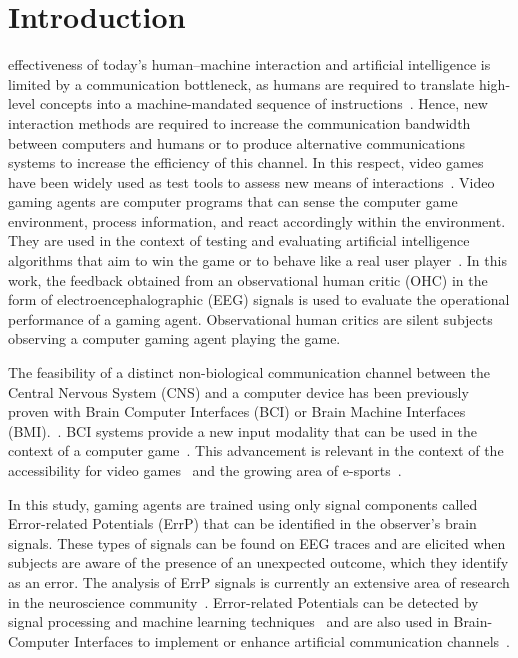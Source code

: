 \documentclass[journal]{IEEEtran}
\begin{document}
\section{Introduction}



 effectiveness of today's human–machine interaction and artificial intelligence is limited by a communication bottleneck, as humans are required to translate high-level concepts into a machine-mandated sequence of instructions~\cite{Xu2020,CURSOR-CONTROL-PAPER}.   Hence, new interaction methods are required to increase the communication bandwidth between computers and humans or to produce alternative communications systems to increase the efficiency of this channel.  In this respect, video games have been widely used as test tools to assess new means of interactions~\cite{Carter2014,Barr2007}. Video gaming agents are computer programs that can sense the computer game environment, process information, and react accordingly within the environment.  They are used in the context of testing and evaluating artificial intelligence algorithms that aim to win the game or to behave like a real user player~\cite{Zhao2020}.
In this work, the feedback obtained from an observational human critic (OHC) in the form of electroencephalographic (EEG) signals is used to evaluate the operational performance of a gaming agent.  Observational human critics are silent subjects observing a computer gaming agent playing the game.

The feasibility of a distinct non-biological communication channel between the Central Nervous System (CNS) and a computer device has been previously proven with Brain Computer Interfaces (BCI) or Brain Machine Interfaces (BMI).~\cite{Vasiljevic2020}.  BCI systems provide a new input modality that can be used in the context of a computer game~\cite{Scherer2012,Nijholt2007}. This advancement is relevant in the context of the accessibility for video games~\cite{Aguado-Delgado2020} and the growing area of e-sports~\cite{Yakovlev2020}.

In this study, gaming agents are trained using only signal components called Error-related Potentials (ErrP) that can be identified in the observer's brain signals.  These types of signals can be found on EEG traces and are elicited when subjects are aware of the presence of an unexpected outcome, which they identify as an error.  The analysis of ErrP signals is currently an extensive area of research in the neuroscience community~\cite{Holroyd2009}. Error-related Potentials can be detected by signal processing and machine learning techniques~\cite{EERP-PAPER} and are also used in Brain-Computer Interfaces to implement or enhance artificial communication channels~\cite{Chavarriaga2014}.
\end{document}
